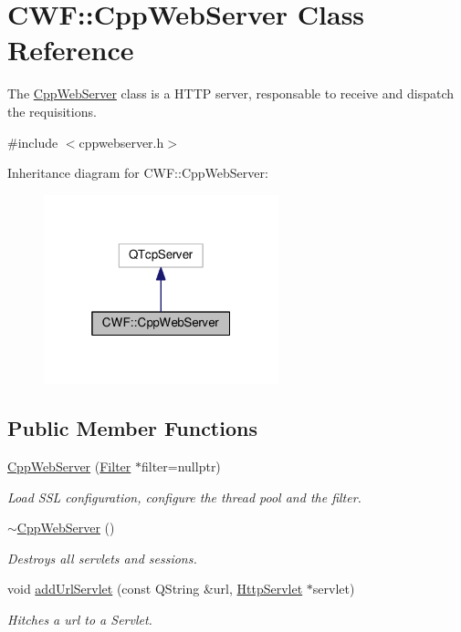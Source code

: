 \hypertarget{class_c_w_f_1_1_cpp_web_server}{\section{C\+W\+F\+:\+:Cpp\+Web\+Server Class Reference}
\label{class_c_w_f_1_1_cpp_web_server}
}


The \hyperlink{class_c_w_f_1_1_cpp_web_server}{Cpp\+Web\+Server} class is a H\+T\+T\+P server, responsable to receive and dispatch the requisitions.  




{\ttfamily \#include $<$cppwebserver.\+h$>$}



Inheritance diagram for C\+W\+F\+:\+:Cpp\+Web\+Server\+:\nopagebreak
\begin{figure}[H]
\begin{center}
\leavevmode
\includegraphics[width=193pt]{class_c_w_f_1_1_cpp_web_server__inherit__graph}
\end{center}
\end{figure}
\subsection*{Public Member Functions}
\begin{DoxyCompactItemize}
\item 
\hyperlink{class_c_w_f_1_1_cpp_web_server_ae462074ec43b8fc04d3239cde4b7f602}{Cpp\+Web\+Server} (\hyperlink{class_c_w_f_1_1_filter}{Filter} $\ast$filter=nullptr)
\begin{DoxyCompactList}\small\item\em Load S\+S\+L configuration, configure the thread pool and the filter. \end{DoxyCompactList}\item 
\hyperlink{class_c_w_f_1_1_cpp_web_server_ab00bb24440420f41b7328a47def0c0cd}{$\sim$\+Cpp\+Web\+Server} ()
\begin{DoxyCompactList}\small\item\em Destroys all servlets and sessions. \end{DoxyCompactList}\item 
void \hyperlink{class_c_w_f_1_1_cpp_web_server_a8acbe56b5d63ded67879f4ed31170c2e}{add\+Url\+Servlet} (const Q\+String \&url, \hyperlink{class_c_w_f_1_1_http_servlet}{Http\+Servlet} $\ast$servlet)
\begin{DoxyCompactList}\small\item\em Hitches a url to a Servlet. \end{DoxyCompactList}\end{DoxyCompactItemize}


